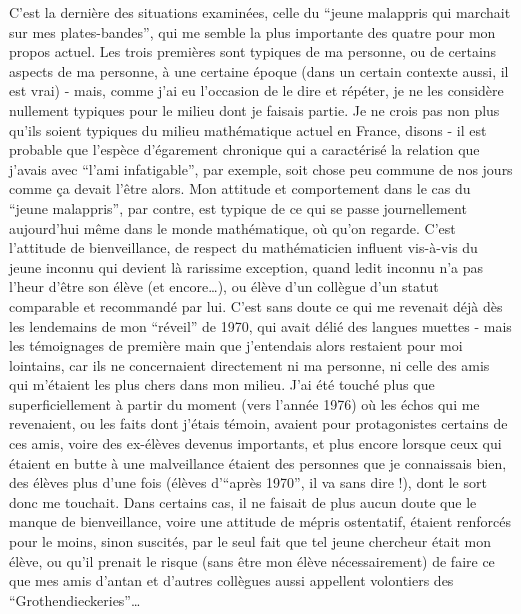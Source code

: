 C'est la dernière des situations examinées, celle du ``jeune malappris qui marchait sur mes plates-bandes'', qui me semble la plus importante des quatre pour mon propos actuel. Les trois premières sont typiques de ma personne, ou de certains aspects de ma personne, à une certaine époque (dans un certain contexte aussi, il est vrai) - mais, comme j'ai eu l'occasion de le dire et répéter, je ne les considère nullement typiques pour le milieu dont je faisais partie. Je ne crois pas non plus qu'ils soient typiques du milieu mathématique actuel en France, disons - il est probable que l'espèce d'égarement chronique qui a caractérisé la relation que j'avais avec ``l'ami infatigable'', par exemple, soit chose peu commune de nos jours comme ça devait l'être alors. Mon attitude et comportement dans le cas du ``jeune malappris'', par contre, est typique de ce qui se passe journellement aujourd'hui même dans le monde mathématique, où qu'on regarde. C'est l'attitude de bienveillance, de respect du mathématicien influent vis-à-vis du jeune inconnu qui devient là rarissime exception, quand ledit inconnu n'a pas l'heur d'être son élève (et encore\ldots), ou élève d'un collègue d'un statut comparable et recommandé par lui. C'est sans doute ce qui me revenait déjà dès les lendemains de mon ``réveil'' de 1970, qui avait délié des langues muettes - mais les témoignages de première main que j'entendais alors restaient pour moi lointains, car ils ne concernaient directement ni ma personne, ni celle des amis qui m'étaient les plus chers dans mon milieu. J'ai été touché plus que superficiellement à partir du moment (vers l'année 1976) où les échos qui me revenaient, ou les faits dont j'étais témoin, avaient pour protagonistes certains de ces amis, voire des ex-élèves devenus importants, et plus encore lorsque ceux qui étaient en butte à une malveillance étaient des personnes que je connaissais bien, des élèves plus d'une fois (élèves d'``après 1970'', il va sans dire !), dont le sort donc me touchait. Dans certains cas, il ne faisait de plus aucun doute que le manque de bienveillance, voire une attitude de mépris ostentatif, étaient renforcés pour le moins, sinon suscités, par le seul fait que tel jeune chercheur était mon élève, ou qu'il prenait le risque (sans être mon élève nécessairement) de faire ce que mes amis d'antan et d'autres collègues aussi appellent volontiers des ``Grothendieckeries''\ldots

